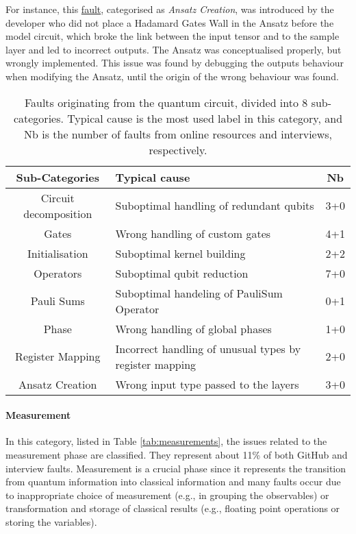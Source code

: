 For instance, this \href{https://github.com/tensorflow/quantum/issues/176}{fault}, categorised as \textit{Ansatz Creation}, was introduced by the developer who did not place a Hadamard Gates Wall in the Ansatz before the model circuit, which broke the link between the input tensor and to the sample layer and led to incorrect outputs. The Ansatz was conceptualised properly, but wrongly implemented. This issue was found by debugging the outputs behaviour when modifying the Ansatz, until the origin of the wrong behaviour was found. 

\begin{table}[hbt!]
    \centering
       \caption{Faults originating from the quantum circuit, divided into 8 sub-categories. Typical cause is the most used label in this category, and Nb is the number of faults from online resources and interviews, respectively.}
    \label{tab:quantum}
    \begin{tabular}{@{}c|l|c}
       \textbf{ Sub-Categories} & \textbf{Typical cause} & \textbf{Nb} \\
         \hline
       Circuit decomposition  & Suboptimal handling of redundant qubits &  3+0 \\
         \hline
       Gates  & Wrong handling of custom gates  & 4+1 \\
         \hline
        Initialisation & Suboptimal kernel building &  2+2 \\
          \hline
        Operators & Suboptimal qubit reduction &  7+0 \\
          \hline
        Pauli Sums & Suboptimal handeling of PauliSum Operator & 0+1 \\
          \hline
        Phase & Wrong handling of global phases &  1+0 \\
          \hline
        Register Mapping & Incorrect handling of unusual types by register mapping &  2+0 \\
          \hline
        Ansatz Creation & Wrong input type passed to the layers &  3+0 \\
    \end{tabular}
\end{table}


\paragraph{Measurement}
In this category, listed in Table \ref{tab:measurements}, the issues related to the measurement phase are classified. They represent about 11\% of both GitHub and interview faults. Measurement is a crucial phase since it represents the transition from quantum information into classical information and many faults occur due to inappropriate choice of measurement (e.g., in grouping the observables) or transformation and storage of classical results (e.g., floating point operations or storing the variables). 

